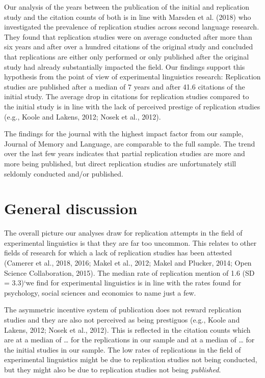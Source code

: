 \documentclass[]{elsarticle} %
\begin{document}
Our analysis of the years between the publication of the initial and
replication study and the citation counts of both is in line with
Marsden et al. (2018) who investigated the prevalence of replication
studies across second language research. They found that replication
studies were on average conducted after more than six years and after
over a hundred citations of the original study and concluded that
replications are either only performed or only published after the
original study had already substantially impacted the field. Our
findings support this hypothesis from the point of view of experimental
linguistics research: Replication studies are published after a median
of 7 years and after 41.6 citations of the initial study. The average
drop in citations for replication studies compared to the initial study
is in line with the lack of perceived prestige of replication studies
(e.g., Koole and Lakens, 2012; Nosek et al., 2012).

The findings for the journal with the highest impact factor from our
sample, Journal of Memory and Language, are comparable to the full
sample. The trend over the last few years indicates that partial
replication studies are more and more being published, but direct
replication studies are unfortunately still seldomly conducted and/or
published.

\hypertarget{general-discussion}{%
\section{General discussion}\label{general-discussion}}

The overall picture our analyses draw for replication attempts in the
field of experimental linguistics is that they are far too uncommon.
This relates to other fields of research for which a lack of replication
studies has been attested (Camerer et al., 2018, 2016; Makel et al.,
2012; Makel and Plucker, 2014; Open Science Collaboration, 2015). The
median rate of replication mention of 1.6 (SD = 3.3)`we find for
experimental linguistics is in line with the rates found for psychology,
social sciences and economics to name just a few.

The asymmetric incentive system of publication does not reward
replication studies and they are also not perceived as being prestiguos
(e.g., Koole and Lakens, 2012; Nosek et al., 2012). This is reflected in
the citation counts which are at a median of \ldots{} for the
replications in our sample and at a median of \ldots{} for the initial
studies in our sample. The low rates of replications in the field of
experimental linguistics might be due to replication studies not being
conducted, but they might also be due to replication studies not being
\emph{published}.
\end{document}
